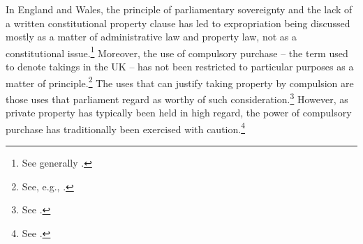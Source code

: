 


In England and Wales, the principle of parliamentary sovereignty and the lack of a written constitutional property clause has led to expropriation being discussed mostly as a matter of administrative law and property law, not as a constitutional issue.\footnote{See generally \cite{taggart98}.} Moreover, the use of compulsory purchase -- the term used to denote takings in the UK -- has not been restricted to particular purposes as a matter of principle.\footnote{See, e.g., \cite[48-49]{waring09}.} The uses that can justify taking property by compulsion are those uses that parliament regard as worthy of such consideration.\footnote{See \cite[48-49]{waring09}.} However, as private property has typically been held in high regard, the power of compulsory purchase has traditionally been exercised with caution.\footnote{See \cite[47-48]{waring09}.}

